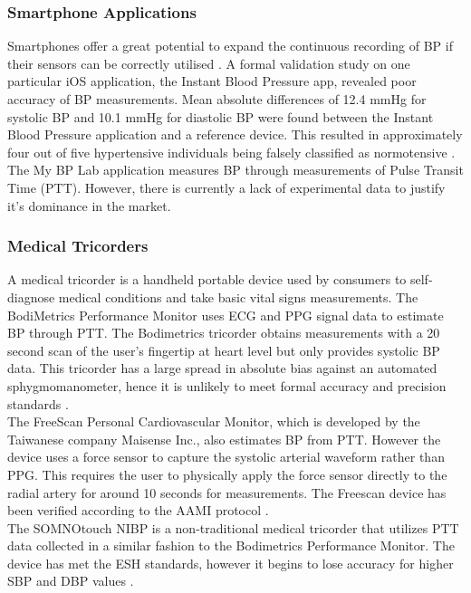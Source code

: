 \subsubsection*{Smartphone Applications}
Smartphones offer a great potential to expand the continuous recording of BP if their sensors can be 
correctly utilised \cite{Bard2019}. A formal validation study on one particular iOS application, the Instant 
Blood Pressure app, revealed poor accuracy of BP measurements. Mean absolute differences of 12.4 mmHg for 
systolic BP and 10.1 mmHg for diastolic BP were found between the Instant Blood Pressure application and a
 reference device. This resulted in approximately four out of five hypertensive individuals being falsely classified 
 as normotensive  \cite{Bard2019}. The My BP Lab application measures BP through measurements of Pulse Transit 
 Time (PTT). However, there is currently a lack of experimental data to justify it's dominance in the market.

\subsubsection*{Medical Tricorders}
A medical tricorder is a handheld portable device used by consumers to self-diagnose medical conditions and take 
basic vital signs measurements. The   BodiMetrics   Performance   Monitor uses ECG and PPG signal data to estimate
 BP through PTT. The Bodimetrics tricorder obtains measurements with a 20 second scan of the user's fingertip
  at heart level but only provides systolic BP data. This tricorder has a large spread in absolute bias against
   an automated sphygmomanometer, hence it is unlikely to meet formal accuracy and precision 
   standards \cite{Bard2019}. \\ \newline \noindent The FreeScan Personal Cardiovascular Monitor, which is 
   developed by the Taiwanese company Maisense Inc., also estimates BP from PTT. However the device uses a force 
   sensor to capture the systolic arterial waveform rather than PPG. This requires the user to physically apply 
   the force sensor directly to the radial artery for around 10 seconds for measurements. The Freescan device 
   has been verified according to the AAMI protocol \cite{Bard2019}. \\ \newline \noindent The SOMNOtouch
    NIBP is a non-traditional medical tricorder that utilizes PTT data collected in a similar fashion to the
     Bodimetrics Performance Monitor. The device has met the ESH standards, however it begins to lose accuracy 
     for higher SBP and DBP values \cite{Bard2019}.

